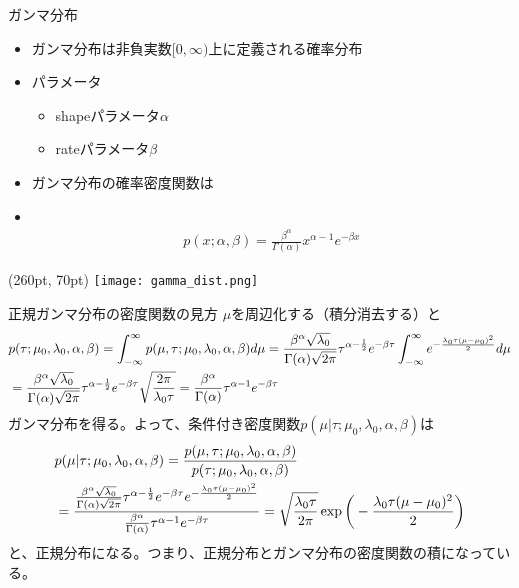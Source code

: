 \documentclass[aspectratio=169,unicode,dvipdfmx,14pt]{beamer}
\begin{document}
\begin{frame}{ガンマ分布}
\begin{itemize}
\item ガンマ分布は非負実数$[0,\infty)$上に定義される確率分布
\item パラメータ
\begin{itemize}
\item shapeパラメータ$\alpha$
\item rateパラメータ$\beta$
\end{itemize}
\item ガンマ分布の確率密度関数は
\item[] \
\begin{align}
p(x;\alpha,\beta)=\frac{\beta^\alpha}{\Gamma(\alpha)}x^{\alpha-1}e^{-\beta x}
\end{align}
\end{itemize}
\begin{textblock*}{0.4\linewidth}(260pt, 70pt)
    \centering
    \texttt{[image: gamma\_dist.png]}
\end{textblock*}
\end{frame}

\begin{frame}{正規ガンマ分布の密度関数の見方}
\FontMath
$\mu$を周辺化する（積分消去する）と
\begin{align}
& p(\tau ; \mu_0, \lambda_0, \alpha, \beta) = \int_{-\infty}^\infty p(\mu, \tau ; \mu_0, \lambda_0, \alpha, \beta) d\mu
= \frac{\beta^\alpha\sqrt{\lambda_0}}{\Gamma(\alpha)\sqrt{2\pi}}
\tau^{\alpha-\frac{1}{2}}e^{-\beta\tau}
\int_{-\infty}^\infty e^{-\frac{\lambda_0\tau(\mu - \mu_0)^2}{2}} d\mu
\notag \\ &
= \frac{\beta^\alpha\sqrt{\lambda_0}}{\Gamma(\alpha)\sqrt{2\pi}}
\tau^{\alpha-\frac{1}{2}}e^{-\beta\tau}
\sqrt{ \frac{2\pi}{\lambda_0\tau} }
= \frac{\beta^\alpha}{\Gamma(\alpha)}
\tau^{\alpha-1}e^{-\beta\tau}
\end{align}
ガンマ分布を得る。よって、条件付き密度関数$p(\mu | \tau ; \mu_0, \lambda_0, \alpha, \beta)$は
\begin{align}
& p(\mu | \tau ; \mu_0, \lambda_0, \alpha, \beta)
= \frac{ p(\mu, \tau ; \mu_0, \lambda_0, \alpha, \beta) }{ p(\tau ; \mu_0, \lambda_0, \alpha, \beta) }
\notag \\ &
= \frac{ \frac{\beta^\alpha\sqrt{\lambda_0}}{\Gamma(\alpha)\sqrt{2\pi}}
\tau^{\alpha-\frac{1}{2}}e^{-\beta\tau}e^{-\frac{\lambda_0\tau(\mu - \mu_0)^2}{2}} }
{ \frac{\beta^\alpha}{\Gamma(\alpha)}
\tau^{\alpha-1}e^{-\beta\tau} }
= \sqrt{ \frac{ \lambda_0\tau }{ 2\pi } } \exp\bigg( - \frac{\lambda_0\tau(\mu - \mu_0)^2}{2} \bigg)
\end{align}
と、正規分布になる。つまり、正規分布とガンマ分布の密度関数の積になっている。
\end{frame}
\end{document}
